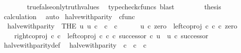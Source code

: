 \begin{isabellebody}
\ \ \ \ \ \ \isamarkupfalse%
\ true{\isacharunderscore}{\kern0pt}false{\isacharunderscore}{\kern0pt}only{\isacharunderscore}{\kern0pt}truth{\isacharunderscore}{\kern0pt}values\ \isamarkupfalse%
\ {\isacharparenleft}{\kern0pt}typecheck{\isacharunderscore}{\kern0pt}cfuncs{\isacharcomma}{\kern0pt}\ blast{\isacharparenright}{\kern0pt}\isanewline
\ \ \isamarkupfalse%
\isanewline
\ \ \isamarkupfalse%
\ \isamarkupfalse%
\ {\isacharquery}{\kern0pt}thesis\isanewline
\ \ \ \ \isamarkupfalse%
\ calculation\ \isamarkupfalse%
\ auto\isanewline
{}\isamarkupfalse%
%
\endisatagproof
{\isafoldproof}%
%
\isadelimproof
%
\endisadelimproof
%
\isadelimdocument
%
\endisadelimdocument
%
\isatagdocument
%
\isamarkuptrue%
%
\endisatagdocument
{\isafolddocument}%
%
\isadelimdocument
%
\endisadelimdocument
{}\isamarkupfalse%
\ halve{\isacharunderscore}{\kern0pt}with{\isacharunderscore}{\kern0pt}parity\ {\isacharcolon}{\kern0pt}{\isacharcolon}{\kern0pt}\ {\isachardoublequoteopen}cfunc{\isachardoublequoteclose}\ \isanewline
\ \ {\isachardoublequoteopen}halve{\isacharunderscore}{\kern0pt}with{\isacharunderscore}{\kern0pt}parity\ {\isacharequal}{\kern0pt}\ {\isacharparenleft}{\kern0pt}THE\ u{\isachardot}{\kern0pt}\ u{\isacharcolon}{\kern0pt}\ {\isasymnat}\isactrlsub c\ {\isasymrightarrow}\ {\isasymnat}\isactrlsub c\ {\isasymCoprod}\ {\isasymnat}\isactrlsub c\ {\isasymand}\ \isanewline
\ \ \ \ u\ {\isasymcirc}\isactrlsub c\ zero\ {\isacharequal}{\kern0pt}\ left{\isacharunderscore}{\kern0pt}coproj\ {\isasymnat}\isactrlsub c\ {\isasymnat}\isactrlsub c\ {\isasymcirc}\isactrlsub c\ zero\ {\isasymand}\isanewline
\ \ \ \ {\isacharparenleft}{\kern0pt}right{\isacharunderscore}{\kern0pt}coproj\ {\isasymnat}\isactrlsub c\ {\isasymnat}\isactrlsub c\ {\isasymamalg}\ {\isacharparenleft}{\kern0pt}left{\isacharunderscore}{\kern0pt}coproj\ {\isasymnat}\isactrlsub c\ {\isasymnat}\isactrlsub c\ {\isasymcirc}\isactrlsub c\ successor{\isacharparenright}{\kern0pt}{\isacharparenright}{\kern0pt}\ {\isasymcirc}\isactrlsub c\ u\ {\isacharequal}{\kern0pt}\ u\ {\isasymcirc}\isactrlsub c\ successor{\isacharparenright}{\kern0pt}{\isachardoublequoteclose}\isanewline
\isanewline
{}\isamarkupfalse%
\ halve{\isacharunderscore}{\kern0pt}with{\isacharunderscore}{\kern0pt}parity{\isacharunderscore}{\kern0pt}def{}{\isacharcolon}{\kern0pt}\isanewline
\ \ {\isachardoublequoteopen}halve{\isacharunderscore}{\kern0pt}with{\isacharunderscore}{\kern0pt}parity\ {\isacharcolon}{\kern0pt}\ {\isasymnat}\isactrlsub c\ {\isasymrightarrow}\ {\isasymnat}\isactrlsub c\ {\isasymCoprod}\ {\isasymnat}\isactrlsub c\ {\isasymand}\ \isanewline

\end{isabellebody}
